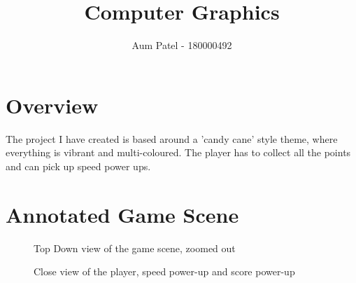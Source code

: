 \documentclass[11pt]{report}
\begin{document}
\author{Aum Patel - 180000492}
\title{Computer Graphics}
\maketitle

\section*{Overview}
The project I have created is based around a 'candy cane' style theme, where everything is vibrant and multi-coloured. The player has to collect all the points and can pick up speed power ups. 

\section*{Annotated Game Scene}

\begin{figure}[H]
    \begin{minipage}{.5\textwidth}
        \centering
        \caption{Top Down view of the game scene, zoomed out}
    \end{minipage}
    \begin{minipage}{.5\textwidth}
        \centering
        \caption{Close view of the player, speed power-up and score power-up}
    \end{minipage}
\end{figure}
\end{document}
